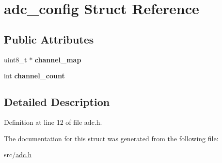 \hypertarget{structadc__config}{}\section{adc\+\_\+config Struct Reference}
\label{structadc__config}
\subsection*{Public Attributes}
\begin{DoxyCompactItemize}
\item 
\hypertarget{structadc__config_a7f7cc3ba237533dd943faddca7555430}{}uint8\+\_\+t $\ast$ {\bfseries channel\+\_\+map}\label{structadc__config_a7f7cc3ba237533dd943faddca7555430}

\item 
\hypertarget{structadc__config_a33bd54712a72f2dcbd6c3d6d53b776ea}{}int {\bfseries channel\+\_\+count}\label{structadc__config_a33bd54712a72f2dcbd6c3d6d53b776ea}

\end{DoxyCompactItemize}


\subsection{Detailed Description}


Definition at line 12 of file adc.\+h.



The documentation for this struct was generated from the following file\+:\begin{DoxyCompactItemize}
\item 
src/\hyperlink{adc_8h}{adc.\+h}\end{DoxyCompactItemize}
